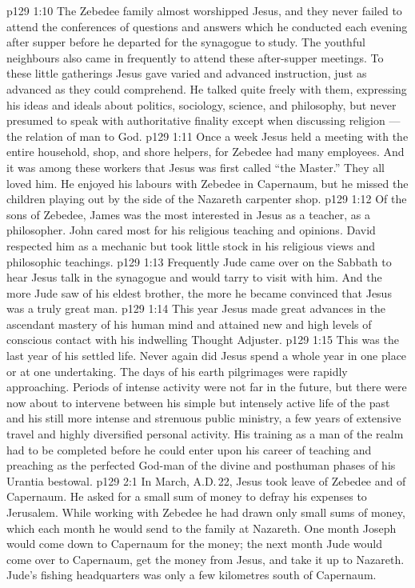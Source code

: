 \vs p129 1:10 The Zebedee family almost worshipped Jesus, and they never failed to attend the conferences of questions and answers which he conducted each evening after supper before he departed for the synagogue to study. The youthful neighbours also came in frequently to attend these after\hyp{}supper meetings. To these little gatherings Jesus gave varied and advanced instruction, just as advanced as they could comprehend. He talked quite freely with them, expressing his ideas and ideals about politics, sociology, science, and philosophy, but never presumed to speak with authoritative finality except when discussing religion --- the relation of man to God.
\vs p129 1:11 Once a week Jesus held a meeting with the entire household, shop, and shore helpers, for Zebedee had many employees. And it was among these workers that Jesus was first called “the Master.” They all loved him. He enjoyed his labours with Zebedee in Capernaum, but he missed the children playing out by the side of the Nazareth carpenter shop.
\vs p129 1:12 Of the sons of Zebedee, James was the most interested in Jesus as a teacher, as a philosopher. John cared most for his religious teaching and opinions. David respected him as a mechanic but took little stock in his religious views and philosophic teachings.
\vs p129 1:13 Frequently Jude came over on the Sabbath to hear Jesus talk in the synagogue and would tarry to visit with him. And the more Jude saw of his eldest brother, the more he became convinced that Jesus was a truly great man.
\vs p129 1:14 \pc This year Jesus made great advances in the ascendant mastery of his human mind and attained new and high levels of conscious contact with his indwelling Thought Adjuster.
\vs p129 1:15 This was the last year of his settled life. Never again did Jesus spend a whole year in one place or at one undertaking. The days of his earth pilgrimages were rapidly approaching. Periods of intense activity were not far in the future, but there were now about to intervene between his simple but intensely active life of the past and his still more intense and strenuous public ministry, a few years of extensive travel and highly diversified personal activity. His training as a man of the realm had to be completed before he could enter upon his career of teaching and preaching as the perfected God\hyp{}man of the divine and posthuman phases of his Urantia bestowal.
\vs p129 2:1 In March, A.D.\,22, Jesus took leave of Zebedee and of Capernaum. He asked for a small sum of money to defray his expenses to Jerusalem. While working with Zebedee he had drawn only small sums of money, which each month he would send to the family at Nazareth. One month Joseph would come down to Capernaum for the money; the next month Jude would come over to Capernaum, get the money from Jesus, and take it up to Nazareth. Jude’s fishing headquarters was only a few kilometres south of Capernaum.
